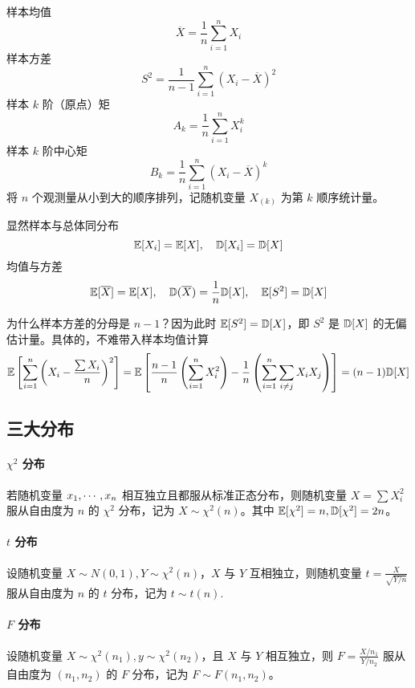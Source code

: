 样本均值
\[ \overline{X} = \frac{1}{n} \sum_{i=1}^n X_i \]
样本方差
\[ S^2 = \frac{1}{n-1} \sum_{i=1}^n (X_i - \overline{X})^2 \]
样本 $k$ 阶（原点）矩
\[ A_k = \frac{1}{n} \sum_{i=1}^n X_i^k \]
样本 $k$ 阶中心矩
\[ B_k = \frac{1}{n} \sum_{i=1}^n (X_i - \overline{X})^k \]
将 $n$ 个观测量从小到大的顺序排列，记随机变量 $X_{(k)}$ 为第 $k$ 顺序统计量。

显然样本与总体同分布
\[ \mathbb{E}[X_i] = \mathbb{E} [X], \quad \mathbb{D}[X_i] = \mathbb{D}[X] \]
均值与方差
\[ \mathbb{E}[\overline{X}] = \mathbb{E} [X], \quad \mathbb{D}(\overline{X}) = \frac{1}{n} \mathbb{D} [X], \quad \mathbb{E}[S^2] = \mathbb{D} [X]  \]

\begin{note}
	为什么样本方差的分母是 $n-1$？因为此时 $\mathbb{E}[S^2] = \mathbb{D} [X]$，即 $S^2$ 是 $\mathbb{D}[X]$ 的无偏估计量。具体的，不难带入样本均值计算
	\[ \mathbb{E}\left[\sum_{i=1}^n \left(X_i - \frac{\sum X_i}{n}\right)^2\right]
		= \mathbb{E}\left[  \frac{n-1}{n} \left(\sum_{i=1}^n X_i^2\right) - \frac{1}{n}
			\left(\sum_{i=1}^{n} \sum_{i \neq j} X_iX_j\right) \right]
		= (n-1) \mathbb{D}[X] \]
\end{note}

\subsection{三大分布}

\paragraph{$\chi^2$ 分布}

若随机变量 $x_1,\cdots,x_n$ 相互独立且都服从标准正态分布，则随机变量 $X = \sum X_i^2$ 服从自由度为 $n$ 的 $\chi^2$ 分布，记为 $X \sim \chi^2(n)$。其中 $\mathbb{E}[\chi^2] = n, \mathbb{D}[\chi^2] = 2n$。


\paragraph{$t$ 分布}

设随机变量 $X \sim N(0, 1), Y \sim \chi^2(n)$，$X$ 与 $Y$ 互相独立，则随机变量 $t = \frac{X}{\sqrt{Y / n}}$ 服从自由度为 $n$ 的 $t$ 分布，记为 $t \sim t(n)$.

\paragraph{$F$ 分布}

设随机变量 $X \sim \chi^2(n_1), y \sim \chi^2(n_2)$，且 $X$ 与 $Y$ 相互独立，则 $F = \frac{X / n_1}{Y / n_2}$ 服从自由度为 $(n_1, n_2)$ 的 $F$ 分布，记为 $F \sim F(n_1, n_2)$。

